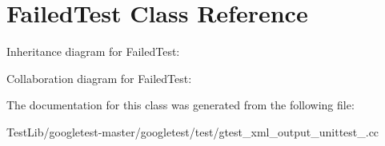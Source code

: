 \hypertarget{classFailedTest}{}\section{Failed\+Test Class Reference}
\label{classFailedTest}


Inheritance diagram for Failed\+Test\+:


Collaboration diagram for Failed\+Test\+:


The documentation for this class was generated from the following file\+:\begin{DoxyCompactItemize}
\item 
Test\+Lib/googletest-\/master/googletest/test/gtest\+\_\+xml\+\_\+output\+\_\+unittest\+\_\+.\+cc\end{DoxyCompactItemize}

